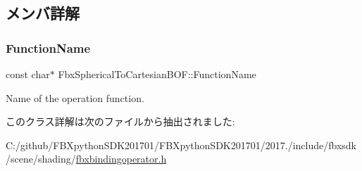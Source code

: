 \subsection{メンバ詳解}
\mbox{\label{class_fbx_spherical_to_cartesian_b_o_f_a17f65fd82d7c31f9233ea2871cc732ad}} 
\subsubsection{\texorpdfstring{Function\+Name}{FunctionName}}
{\footnotesize\ttfamily const char$\ast$ Fbx\+Spherical\+To\+Cartesian\+B\+O\+F\+::\+Function\+Name\hspace{0.3cm}{\ttfamily [static]}}



Name of the operation function. 



このクラス詳解は次のファイルから抽出されました\+:\begin{DoxyCompactItemize}
\item 
C\+:/github/\+F\+B\+Xpython\+S\+D\+K201701/\+F\+B\+Xpython\+S\+D\+K201701/2017./include/fbxsdk/scene/shading/\hyperlink{fbxbindingoperator_8h}{fbxbindingoperator.\+h}\end{DoxyCompactItemize}
